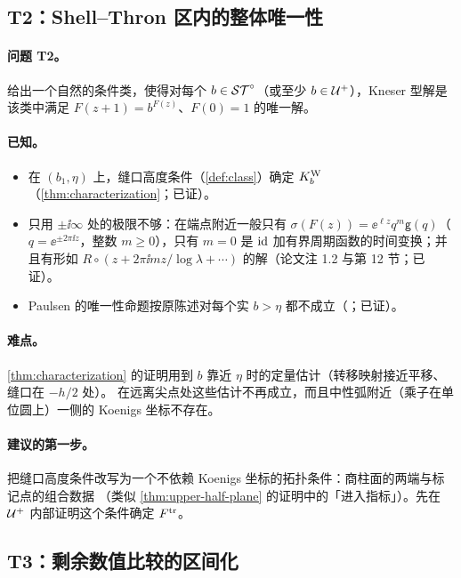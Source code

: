\subsection{T2：Shell--Thron 区内的整体唯一性}\label{ch12:sec:T2}

\paragraph{问题 T2。}给出一个自然的条件类，使得对每个 $b\in\mathcal{ST}^\circ$（或至少 $b\in\mathcal U^{+}$），Kneser 型解是该类中满足
$F(z+1)=b^{F(z)}$、$F(0)=1$ 的唯一解。

\paragraph{已知。}
\begin{itemize}
\item 在 $(b_1,\eta)$ 上，缝口高度条件（\cref{def:class}）确定 $K^{\mathrm W}_b$（\cref{thm:characterization}；已证）。
\item 只用 $\pm\ii\infty$ 处的极限不够：在端点附近一般只有 $\sigma(F(z))=\ee^{\ell z}q^m\mathsf g(q)$（$q=\ee^{\pm2\pi\ii z}$，整数 $m\ge0$），只有 $m=0$ 是
  $\mathrm{id}$ 加有界周期函数的时间变换；并且有形如 $R\circ(z+2\pi\ii mz/\log\lambda+\cdots)$ 的解（论文注 1.2 与第 12 节；已证）。
\item Paulsen 的唯一性命题按原陈述对每个实 $b>\eta$ 都不成立（\cite[注~1.2]{KneserPaper}；已证）。
\end{itemize}

\paragraph{难点。}\cref{thm:characterization} 的证明用到 $b$ 靠近 $\eta$ 时的定量估计（转移映射接近平移、缝口在 $-h/2$ 处）。
在远离尖点处这些估计不再成立，而且中性弧附近（乘子在单位圆上）一侧的 Koenigs 坐标不存在。

\paragraph{建议的第一步。}把缝口高度条件改写为一个不依赖 Koenigs 坐标的拓扑条件：商柱面的两端与标记点的组合数据
（类似 \cref{thm:upper-half-plane} 的证明中的「进入指标」）。先在 $\mathcal U^{+}$ 内部证明这个条件确定 $F^{\mathrm{tr}}$。

\subsection{T3：剩余数值比较的区间化}\label{ch12:sec:T3}

